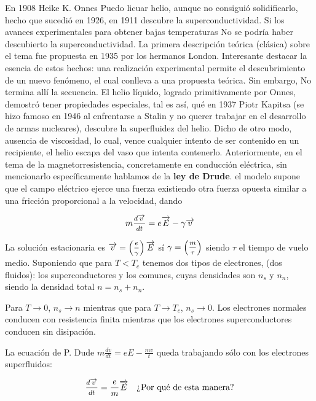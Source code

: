 En 1908 Heike K. Onnes Puedo licuar helio, aunque no consiguió solidificarlo, hecho que sucedió en 1926, en 1911 descubre la superconductividad. Si los avances experimentales para obtener bajas temperaturas No se podría haber descubierto la superconductividad. La primera descripción teórica (clásica) sobre el tema fue propuesta en 1935 por los hermanos London. Interesante destacar la esencia de estos hechos: una realización experimental permite el descubrimiento de un nuevo fenómeno, el cual conlleva a una propuesta teórica. Sin embargo, No termina allí la secuencia. El helio líquido, logrado primitivamente por Onnes, demostró tener propiedades especiales, tal es así, qué en 1937 Piotr Kapitsa (se hizo famoso en 1946 al enfrentarse a Stalin y no querer trabajar en el desarrollo de armas nucleares), descubre la superfluidez del helio. Dicho de otro modo, ausencia de viscosidad, lo cual, vence cualquier intento de ser contenido en un recipiente, el helio escapa del vaso que intenta contenerlo. Anteriormente, en el tema de la magnetorresistencia, concretamente en conducción eléctrica, sin mencionarlo específicamente hablamos de la \textbf{ley de Drude}. el modelo supone que el campo eléctrico ejerce una fuerza existiendo otra fuerza opuesta similar a una fricción proporcional a la velocidad, dando

\begin{equation}
	m\mfrac{d\overrightarrow{v}}{dt}=e\overrightarrow{E}-\gamma \overrightarrow{v}
\end{equation}

La solución estacionaria es $\overrightarrow{v}=\left(\mfrac{e}{\gamma} \right) \overrightarrow{E}$ sí $\gamma=\left(\mfrac{m}{\tau} \right)$ siendo $\tau$ el tiempo de vuelo medio. Suponiendo que para $T<T_{c}$ tenemos dos tipos de electrones, (dos fluidos): los superconductores y los comunes, cuyas densidades son $n_{s}$ y $n_{n}$, siendo la densidad total $n=n_{s}+n_{n}$.

Para $T\rightarrow 0$, $n_{s}\rightarrow n$ mientras que para $T\rightarrow T_{c}$, $n_{s}\rightarrow 0$. Los electrones normales conducen con resistencia finita mientras que los electrones superconductores conducen sin disipación. 

La ecuación de P. Dude $m\frac{dv}{dt} = eE-\frac{mv}{t}$ queda trabajando sólo con los electrones superfluidos:

\begin{equation}
	\mfrac{d\overrightarrow{v}}{dt}=\frac{e}{m}\overrightarrow{E} \quad \text{¿Por qué de esta manera?}
\end{equation}

